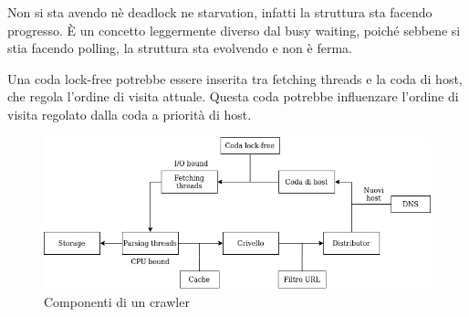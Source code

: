 Non si sta avendo nè deadlock ne starvation, infatti la struttura sta facendo progresso. 
È un concetto leggermente diverso dal busy waiting, poiché sebbene si stia facendo polling, la struttura sta evolvendo e non è ferma.

\begin{remark}
    Una coda lock-free potrebbe essere inserita tra fetching threads e la coda di host, 
    che regola l'ordine di visita attuale. Questa coda potrebbe influenzare l'ordine 
    di visita regolato dalla coda a priorità di host.
\end{remark}

\begin{figure}[h]
    \includegraphics[width=\textwidth]{images/crawling}
    \caption{Componenti di un crawler}
\end{figure}
\newpage
